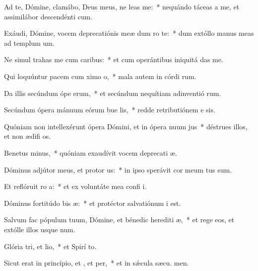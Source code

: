 \item Ad te, Dómine, clamábo, Deus meus, ne leas  me:~* nequándo táceas a me, et assimilábor descendénti  cum.
\item Exáudi, Dómine, vocem deprecatiónis meæ dum ro  te:~* dum extóllo manus meas ad templum  um.
\item Ne simul trahas me cum caribus:~* et cum operántibus iniquitá  das me.
\item Qui loquúntur pacem cum ximo o,~* mala autem in córdi rum.
\item Da illis secúndum ópe erum,~* et secúndum nequítiam adinventió rum.
\item Secúndum ópera mánuum eórum bue lis,~* redde retributiónem e sis.
\item Quóniam non intellexérunt ópera Dómini, et in ópera nuum jus~* déstrues illos, et non ædifi os.
\item Benetus minus,~* quóniam exaudívit vocem deprecati æ.
\item Dóminus adjútor meus, et protor us:~* in ipso sperávit cor meum  tus sum.
\item Et reflóruit ro a:~* et ex voluntáte mea confi i.
\item Dóminus fortitúdo bis æ:~* et protéctor salvatiónum  i est.
\item Salvum fac pópulum tuum, Dómine, et bénedic herediti æ,~* et rege eos, et extólle illos usque  num.
\item Glória tri, et lio,~* et Spirí to.
\item Sicut erat in princípio, et , et per,~* et in sǽcula sæcu. men.
